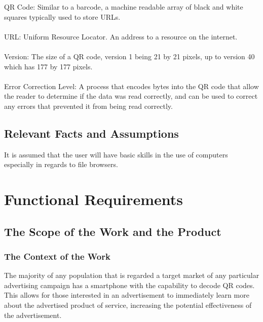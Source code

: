 \documentclass[12pt, titlepage]{article}
\begin{document}
			QR Code: Similar to a barcode, a machine readable array of black 
			and white squares typically used to store URLs.
			\paragraph{}
			URL: Uniform Resource Locator. An address to a resource on the 
			internet.
			\paragraph{}
			Version: The size of a QR code, version 1 being 21 by 21 pixels, up 
			to version 40 which has 177 by 177 pixels.
			\paragraph{}
			Error Correction Level: A process that encodes bytes into the QR 
			code that allow the reader to determine if the data was read 
			correctly, and can be used to correct any errors that prevented it 
			from being read correctly.

\subsection{Relevant Facts and Assumptions}

	It is assumed that the user will have basic skills in the use of computers 
	especially in regards to file browsers.

\section{Functional Requirements}

\subsection{The Scope of the Work and the Product}

\subsubsection{The Context of the Work}
	
	The majority of any population that is regarded a target market of any 
	particular advertising campaign has a smartphone with the capability to 
	decode QR codes. This allows for those interested in an advertisement to 
	immediately learn more about the advertised product of service, increasing 
	the potential effectiveness of the advertisement.
	
\end{document}
